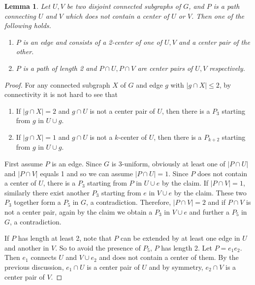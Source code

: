 \documentclass[a4paper]{article}
\newtheorem{lem}[thm]{Lemma}
\begin{document}
\begin{lem}\label{conpath}
    Let $U,V$ be two disjoint connected subgraphs of $G$, and $P$ is a path connecting $U$ and $V$ which does not contain a center of $U$ or $V$. Then one of the following holds.
    \begin{enumerate}
    \item $P$ is an edge and consists of a 2-center of one of $U,V$ and a center pair of the other.
    \item $P$ is a path of length 2 and $P\cap U, P\cap V$ are center pairs of $U,V$ respectively.
    \end{enumerate}
\end{lem}

\begin{proof}
    For any connected subgraph $X$ of $G$ and edge $g$ with $|g\cap X|\leq 2$, by connectivity it is not hard to see that
    \begin{enumerate}
        \item If $|g\cap X|=2$ and $g\cap U$ is not a center pair of $U$, then there is a $P_3$ starting from $g$ in $U\cup g$.
        \item If $|g\cap X|=1$ and $g\cap U$ is not a $k$-center of $U$, then there is a $P_{k+2}$ starting from $g$ in $U\cup g$.
    \end{enumerate}

    First assume $P$ is an edge. Since $G$ is 3-uniform, obviously at least one of $|P\cap U|$ and $|P\cap V|$ equals 1 and so we can assume $|P\cap U|=1$. Since $P$ does not contain a center of $U$, there is a $P_3$ starting from $P$ in $U\cup e$ by the claim. If $|P\cap V|=1$, similarly there exist another $P_3$ starting from $e$ in $V\cup e$ by the claim.
    These two $P_3$ together form a $P_5$ in $G$, a contradiction. Therefore, $|P\cap V|=2$ and if $P\cap V$ is not a center pair, again by the claim we obtain a $P_3$ in $V\cup e$ and further a $P_5$ in $G$, a contradiction.
     
    If $P$ has length at least 2, note that $P$ can be extended by at least one edge in $U$ and another in $V$. So to avoid the presence of $P_5$, $P$ has length 2. Let $P = e_1e_2$. Then $e_1$ connects $U$ and $V\cup e_2$ and does not contain a center of them. By the previous discussion, $e_1\cap U$ is a center pair of $U$ and by symmetry, $e_2\cap V$ is a center pair of $V$.
\end{proof}
\end{document}
